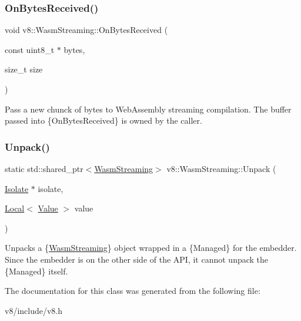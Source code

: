 \subsubsection{\texorpdfstring{On\+Bytes\+Received()}{OnBytesReceived()}}
{\footnotesize\ttfamily void v8\+::\+Wasm\+Streaming\+::\+On\+Bytes\+Received (\begin{DoxyParamCaption}\item[{const uint8\+\_\+t $\ast$}]{bytes,  }\item[{size\+\_\+t}]{size }\end{DoxyParamCaption})}

Pass a new chunck of bytes to Web\+Assembly streaming compilation. The buffer passed into \{On\+Bytes\+Received\} is owned by the caller. \mbox{\label{classv8_1_1WasmStreaming_a343acdb301ae8c21b49c177ac28f2b07}} 
\subsubsection{\texorpdfstring{Unpack()}{Unpack()}}
{\footnotesize\ttfamily static std\+::shared\+\_\+ptr$<$\mbox{\hyperlink{classv8_1_1WasmStreaming}{Wasm\+Streaming}}$>$ v8\+::\+Wasm\+Streaming\+::\+Unpack (\begin{DoxyParamCaption}\item[{\mbox{\hyperlink{classv8_1_1Isolate}{Isolate}} $\ast$}]{isolate,  }\item[{\mbox{\hyperlink{classv8_1_1Local}{Local}}$<$ \mbox{\hyperlink{classv8_1_1Value}{Value}} $>$}]{value }\end{DoxyParamCaption})\hspace{0.3cm}{\ttfamily [static]}}

Unpacks a \{\mbox{\hyperlink{classv8_1_1WasmStreaming}{Wasm\+Streaming}}\} object wrapped in a \{Managed\} for the embedder. Since the embedder is on the other side of the A\+PI, it cannot unpack the \{Managed\} itself. 

The documentation for this class was generated from the following file\+:\begin{DoxyCompactItemize}
\item 
v8/include/v8.\+h\end{DoxyCompactItemize}
